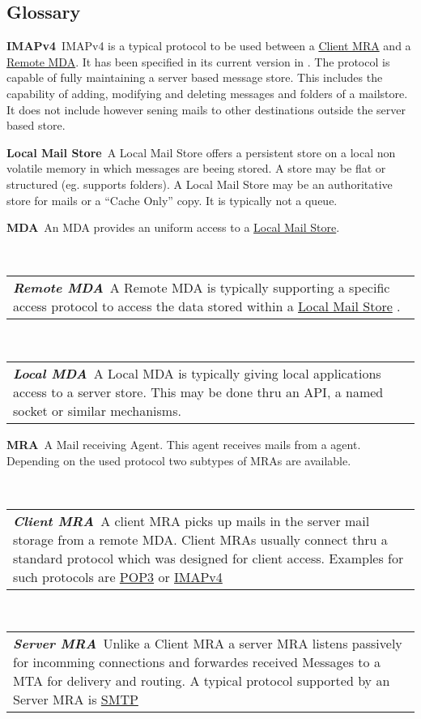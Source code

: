 \documentclass[10pt,a4paper]{book}
\makeatletter
\newenvironment{entry}{\par\leavevmode\hangpara{1.5mm}{1}\ignorespaces}{\RaggedRight\par}
\newcommand*{\mainentry}[2]{{\bfseries{#1\label{def:#1}}}~#2\par}
\newcommand*{\subentry}[2]{\par~\begin{tabular}{p{\textwidth-.6cm}@{}}{\bfseries{\itshape{#1\label{def:#1}}}}~#2\end{tabular}}
\newcommand*{\defref}[1]{\hyperref[def:#1]{#1}}
\makeatother
\begin{document}
\backmatter
\begin{appendices}
\chapter{Glossary}

\begin{entry}
  \mainentry{IMAPv4}{IMAPv4 is a typical protocol to be used between a \defref{Client MRA} and a \defref{Remote MDA}. It has been specified in its current version in \cite{RFC3501}. The protocol is capable of fully maintaining a server based message store. This includes the capability of adding, modifying and deleting messages and folders of a mailstore. It does not include however sening mails to other destinations outside the server based store.}
\end{entry}

\begin{entry}
  \mainentry{Local Mail Store}{A Local Mail Store offers a persistent store on a local non volatile memory in which messages are beeing stored. A store may be flat or structured (eg. supports folders). A Local Mail Store may be an authoritative store for mails or a "`Cache Only"' copy. It is typically not a queue.}
\end{entry}

\begin{entry}
  \mainentry{MDA}{An MDA provides an uniform access to a \defref{Local Mail Store}.}
  \subentry{Remote MDA}{A Remote MDA is typically supporting a specific access protocol to access the data stored within a \defref{Local Mail Store} .}
  \subentry{Local MDA}{A Local MDA is typically giving local applications access to a server store. This may be done thru an API, a named socket or similar mechanisms.}
\end{entry}

\begin{entry}
  \mainentry{MRA}{A Mail receiving Agent. This agent receives mails from a agent. Depending on the used protocol two subtypes of MRAs are available.}
  \subentry{Client MRA}{A client MRA picks up mails in the server mail storage from a remote MDA. Client MRAs usually connect thru a standard protocol which was designed for client access. Examples for such protocols are \defref{POP3} or \defref{IMAPv4}}
  \subentry{Server MRA}{Unlike a Client MRA a server MRA listens passively for incomming connections and forwardes received Messages to a MTA for delivery and routing. A typical protocol supported by an Server MRA is \defref{SMTP}}
\end{entry}


\end{appendices}
\end{document}
